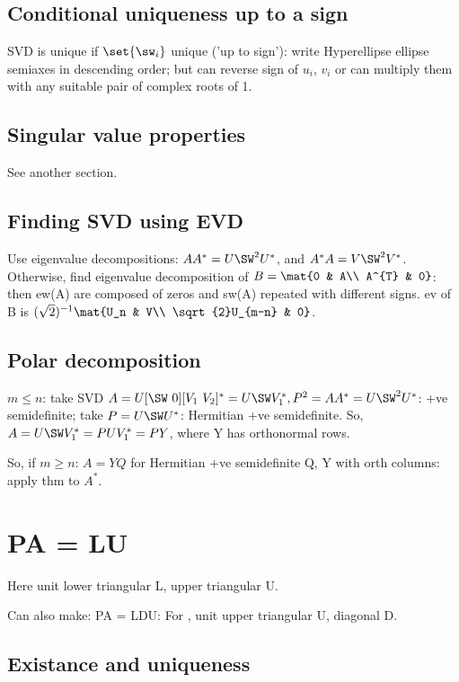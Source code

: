 \documentclass[oneside, article]{memoir}
\begin{document}
\subsection{Conditional uniqueness up to a sign}
SVD is unique if $\set{\sw_{i}}$ unique ('up to sign'): write Hyperellipse ellipse semiaxes in descending order; but can reverse sign of $u_{i}$, $v_{i}$ or can multiply them with any suitable pair of complex roots of 1.

\subsection{Singular value properties}
See another section.

\subsection{Finding SVD using EVD}
Use eigenvalue decompositions: $AA^{*} = U \SW^{2}U^{*}$, and $A^{*}A = V \SW^{2}V^{*}$. Otherwise, find eigenvalue decomposition of $B = \mat{0 & A\\ A^{T} & 0}$: then ew(A) are composed of zeros and sw(A) repeated with different signs. ev of B is $(\sqrt{2})^{-1}\mat{U_n & V\\ \sqrt{2}U_{m-n} & 0}$.

\subsection{Polar decomposition}
$m \leq n$: take SVD $A = U [\SW\ 0] [V_{1}\ V_{2}]^{*} = U \SW V_{1}^{*},\\
 P^{2} = AA^{*} = U \SW^{2}U^{*}$: +ve semidefinite; take $P = U \SW U^{*}$: Hermitian +ve semidefinite. So, $A = U \SW V_{1}^{*} = PUV_{1}^{*} = PY$, where Y has orthonormal rows.

So, if $m \geq n$: $A = YQ$ for Hermitian +ve semidefinite Q, Y with orth columns: apply thm to $A^{*}$.

\section{PA = LU}
Here unit lower triangular L, upper triangular U.

Can also make: PA = LDU: For , unit upper triangular U, diagonal D.

\subsection{Existance and uniqueness}
\end{document}
